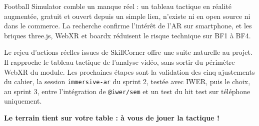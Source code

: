 \documentclass[11pt,a4paper]{article}
\newcommand{\code}[1]{\texttt{#1}}
\begin{document}
Football Simulator comble un manque réel : un tableau tactique en réalité augmentée, gratuit et ouvert depuis un simple lien, n'existe ni en open source ni dans le commerce. La recherche confirme l'intérêt de l'AR sur smartphone, et les briques three.js, WebXR et boardx réduisent le risque technique sur BF1 à BF4.

Le rejeu d'actions réelles issues de SkillCorner offre une suite naturelle au projet. Il rapproche le tableau tactique de l'analyse vidéo, sans sortir du périmètre WebXR du module. Les prochaines étapes sont la validation des cinq ajustements du cahier, la session \code{immersive-ar} du sprint 2, testée avec IWER, puis le choix, au sprint 3, entre l'intégration de \code{@iwer/sem} et un test du hit test sur téléphone uniquement.

\vspace{0.6cm}
\begin{center}
  {\large\bfseries\color{terrain} Le terrain tient sur votre table : à vous de jouer la tactique !}
\end{center}
\end{document}

